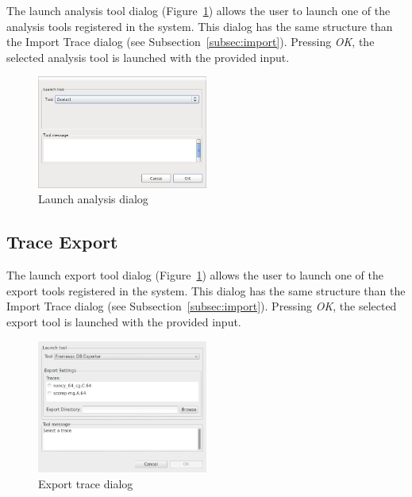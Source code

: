 \documentclass[twoside]{article}
\begin{document}
\begin{sloppypar}
The launch analysis tool dialog (Figure~\ref{fig:analysis_dialog}) allows the user to launch one of the analysis tools registered in the system.
This dialog has the same structure than the Import Trace dialog (see Subsection~\ref{subsec:import}). 
Pressing \emph{OK}, the selected analysis tool is launched with the provided input. 

\begin{figure}[h!]
  \centering
    \includegraphics[width=0.5\textwidth]{images/analysis_dialog.png}
  \caption{Launch analysis dialog}
  \label{fig:analysis_dialog}
\end{figure}

\subsection{Trace Export}
\label{subsec:export}

The launch export tool dialog (Figure~\ref{fig:analysis_dialog}) allows the user to launch one of the export tools registered in the system.
This dialog has the same structure than the Import Trace dialog (see Subsection~\ref{subsec:import}). 
Pressing \emph{OK}, the selected export tool is launched with the provided input. 

\begin{figure}[h!]
  \centering
    \includegraphics[width=0.5\textwidth]{images/export_dialog.png}
  \caption{Export trace dialog}
  \label{fig:export_dialog}
\end{figure}

\newpage


\end{sloppypar}
\end{document}
